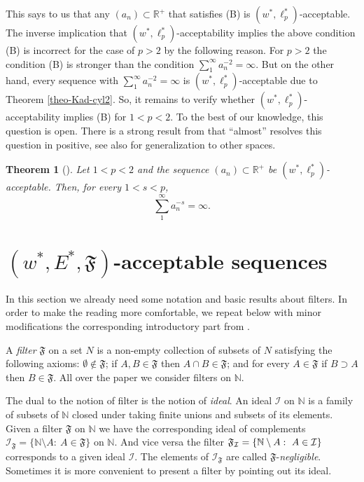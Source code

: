 \documentclass[11pt,twoside, reqno]{amsart}
\newcommand{\F}{\mathfrak{F}}
\theoremstyle{plain}
\newtheorem{theorem}{Theorem}[section]
\theoremstyle{remark}
\theoremstyle{definition}
\numberwithin{equation}{section}
\begin{document}
This says to us that any $(a_n) \subset {\mathbb{R}}^+$ that satisfies (B) is $(w^*,\ell_p^*)$-acceptable. The inverse implication that $(w^*,\ell_p^*)$-acceptability implies the above condition (B) is incorrect for the case of $p > 2$ by the following reason. For $p > 2$ the condition (B) is stronger than the condition $\sum_1^\infty a_n^{-2}=\infty$. But on the other hand, every sequence with $\sum_1^\infty a_n^{-2}=\infty$ is $(w^*,\ell_p^*)$-acceptable due to Theorem \ref{theo-Kad-cyl2}. So, it remains to verify whether $(w^*,\ell_p^*)$-acceptability implies (B) for $1<p<2$. To the best of our knowledge, this question is open. There is a strong result from \cite{Shkarin} that ``almost'' resolves this question in positive, see also \cite{bay} for generalization to other spaces.

\begin{theorem}[{\cite[Proposition 5.3]{Shkarin}}]  \label{theorE*=ell_p++}
Let $1<p<2$ and the sequence $(a_n) \subset {\mathbb{R}}^+$ be $(w^*,\ell_p^*)$-acceptable. Then, for every $1<s<p$, 
$$
\sum_1^\infty a_n^{-s}=\infty.
$$
\end{theorem}



\section{ $(w^*, E^*, \F)$-acceptable sequences} \label{sec_3}

In this section we already need some notation and basic results about filters. In order to make the reading more comfortable, we repeat below with minor modifications the corresponding introductory part from \cite[Section 3]{kaleor}. 

A \textit{filter} $\F$ on a set $N$ is a non-empty
collection of subsets of $N$ satisfying the following axioms: $\emptyset
\notin \F$; if $A,B \in \F$ then $A \cap B \in \F$; and for every $A \in \F$ if $B \supset A$ then $B \in \F$. All over the paper we consider filters on ${\mathbb{N}}$.

The dual to the notion of filter is the notion of \textit{ideal}. An ideal $%
\mathcal{I}$ on ${\mathbb{N}}$ is a family of subsets of ${\mathbb{N}}$
closed under taking finite unions and subsets of its elements. Given a
filter $\F$ on ${\mathbb{N}}$ we have the corresponding ideal of
complements $\mathcal{I}_{\F}=\{{\mathbb{N}}\setminus A:\ A\in%
\F\}$ on ${\mathbb{N}}$. And vice versa the filter $\F_{%
\mathcal{I}}=\{{\mathbb{N}}\setminus A:\ A\in\mathcal{I}\}$ corresponds to a
given ideal $\mathcal{I}$. The elements of $\mathcal{I}_{\F}$ are
called $\F$-\textit{negligible}. Sometimes it is more convenient to
present a filter by pointing out its ideal.
\end{document}

